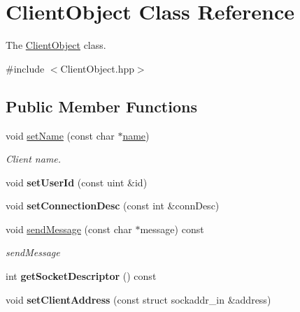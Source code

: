 \hypertarget{classClientObject}{}\section{Client\+Object Class Reference}
\label{classClientObject}


The \hyperlink{classClientObject}{Client\+Object} class.  




{\ttfamily \#include $<$Client\+Object.\+hpp$>$}

\subsection*{Public Member Functions}
\begin{DoxyCompactItemize}
\item 
\mbox{\label{classClientObject_ab91f5a41ec123f2d312c7162eda4dff4}} 
void \hyperlink{classClientObject_ab91f5a41ec123f2d312c7162eda4dff4}{set\+Name} (const char $\ast$\hyperlink{classClientObject_ae5cc4e5bbbb99cdbe152273daa15633a}{name})
\begin{DoxyCompactList}\small\item\em Client name. \end{DoxyCompactList}\item 
\mbox{\label{classClientObject_a91713ffa31ed38978f10139dc2ddb81f}} 
void {\bfseries set\+User\+Id} (const uint \&id)
\item 
\mbox{\label{classClientObject_a6cc23f4c8d93b2945399a7c5c0af7501}} 
void {\bfseries set\+Connection\+Desc} (const int \&conn\+Desc)
\item 
void \hyperlink{classClientObject_a4704430f61bd85efd980c6ea083d5374}{send\+Message} (const char $\ast$message) const
\begin{DoxyCompactList}\small\item\em send\+Message \end{DoxyCompactList}\item 
\mbox{\label{classClientObject_a32f1b03ba465cda2796f48a46ef356df}} 
int {\bfseries get\+Socket\+Descriptor} () const
\item 
\mbox{\label{classClientObject_a49c720a1b38e12ebad46f2e9c9cde1b1}} 
void {\bfseries set\+Client\+Address} (const struct sockaddr\+\_\+in \&address)
\end{DoxyCompactItemize}
